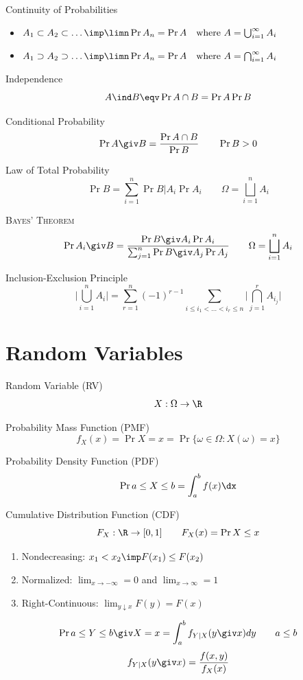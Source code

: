 \documentclass[landscape]{article}
\begin{document}
\begin{multicols*}{2}
Continuity of Probabilities
\begin{itemize}
  \item $A_1 \subset A_2 \subset \dots \imp \limn \Pr{A_n} = \Pr{A}
    \quad\text{where } A = \bigcup_{i=1}^\infty A_i$
  \item $A_1 \supset A_2 \supset \dots \imp \limn \Pr{A_n} = \Pr{A}
    \quad\text{where } A = \bigcap_{i=1}^\infty A_i$
\end{itemize}

Independence \ind
\[A \ind B \eqv \Pr{A \cap B} = \Pr{A}\Pr{B}\]

Conditional Probability
\[\Pr{A \giv B} = \frac{\Pr{A \cap B}}{\Pr{B}} \qquad \Pr{B} > 0\]

Law of Total Probability
\[ \Pr{B} = \sum_{i=1}^n \Pr{B|A_i}\Pr{A_i}
  \qquad \Omega = \bigsqcup_{i=1}^n A_i\]

\textsc{Bayes' Theorem}
\[\Pr{A_i \giv B}
= \frac{\Pr{B \giv A_i}\Pr{A_i}}{\sum_{j=1}^n \Pr{B \giv A_j}\Pr{A_j}}
\qquad \Omega = \bigsqcup_{i=1}^n A_i\]

Inclusion-Exclusion Principle
\[\biggl|\bigcup_{i=1}^n A_i\biggr| = \sum_{r=1}^n(-1)^{r-1}
  \sum_{i \le i_1 < \dots < i_r \le n}\biggl|\bigcap_{j=1}^r A_{i_j}\biggr|\]

\section{Random Variables}

Random Variable (RV)
\[X: \Omega \to \R\]

Probability Mass Function (PMF)
\[f_X(x) = \Pr{X = x} = \Pr{\{\omega\in\Omega:X(\omega) = x\}}\]

Probability Density Function (PDF)
\[\Pr{a \le X \le b} = \int_a^b f(x)\dx\]

Cumulative Distribution Function (CDF)
\[F_X:\R \to [0,1] \qquad F_X(x) = \Pr{X \le x}\]

\begin{enumerate}
  \item Nondecreasing: $x_1 < x_2 \imp F(x_1) \le F(x_2)$
  \item Normalized: $\lim_{x\to -\infty} = 0$ and $\lim_{x\to \infty} = 1$
  \item Right-Continuous: $\lim_{y\downarrow x} F(y) = F(x)$
\end{enumerate}

\[\Pr{a\le Y\le b \giv X=x} = \int_a^b f_{Y|X}(y\giv x) dy \qquad a \le b\]
\[ f_{Y|X}(y\giv x) = \frac{f(x,y)}{f_X(x)} \]


\end{multicols*}
\end{document}
